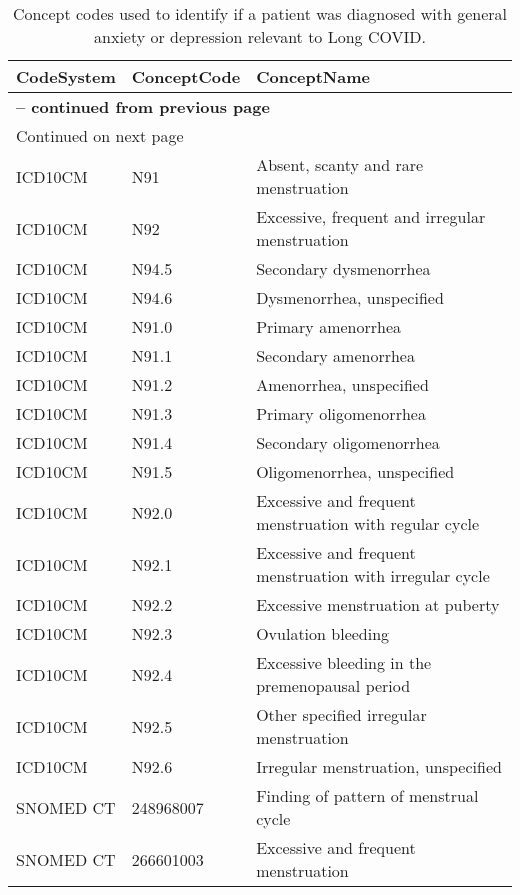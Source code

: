 \begin{longtable}{p{}p{}p{}}
\caption{Concept codes used to identify if a patient was diagnosed with general anxiety or depression relevant to Long COVID.} \\ 
 CodeSystem & ConceptCode & ConceptName \\ 
  \hline 
\endfirsthead 
\multicolumn{3}{p{\textwidth}}{{ \bfseries \tablename \thetable{} -- continued from previous page}} \ 
\hline CodeSystem & ConceptCode & ConceptName \\ \hline 
\endhead 
\hline \multicolumn{3}{p{\textwidth}}{{Continued on next page}} \\ \hline 
\endfoot 
\hline 
\endlastfoot 
 \hline
ICD10CM & N91 & Absent, scanty and rare menstruation \\ 
  ICD10CM & N92 & Excessive, frequent and irregular menstruation \\ 
  ICD10CM & N94.5 & Secondary dysmenorrhea \\ 
  ICD10CM & N94.6 & Dysmenorrhea, unspecified \\ 
  ICD10CM & N91.0 & Primary amenorrhea \\ 
  ICD10CM & N91.1 & Secondary amenorrhea \\ 
  ICD10CM & N91.2 & Amenorrhea, unspecified \\ 
  ICD10CM & N91.3 & Primary oligomenorrhea \\ 
  ICD10CM & N91.4 & Secondary oligomenorrhea \\ 
  ICD10CM & N91.5 & Oligomenorrhea, unspecified \\ 
  ICD10CM & N92.0 & Excessive and frequent menstruation with regular cycle \\ 
  ICD10CM & N92.1 & Excessive and frequent menstruation with irregular cycle \\ 
  ICD10CM & N92.2 & Excessive menstruation at puberty \\ 
  ICD10CM & N92.3 & Ovulation bleeding \\ 
  ICD10CM & N92.4 & Excessive bleeding in the premenopausal period \\ 
  ICD10CM & N92.5 & Other specified irregular menstruation \\ 
  ICD10CM & N92.6 & Irregular menstruation, unspecified \\ 
  SNOMED CT & 248968007 & Finding of pattern of menstrual cycle \\ 
  SNOMED CT & 266601003 & Excessive and frequent menstruation \\ 

\end{longtable}
